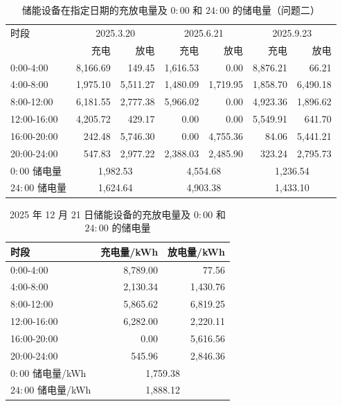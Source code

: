 \begin{table}[htbp]
  \centering
  \caption{储能设备在指定日期的充放电量及 $0{:}00$ 和 $24{:}00$ 的储电量（问题二）}
  \label{tab:p2-storage}
  \footnotesize
  \begin{tabular}{lrrrrrr}
    \toprule
    时段 & \multicolumn{2}{c}{2025.3.20} & \multicolumn{2}{c}{2025.6.21} & \multicolumn{2}{c}{2025.9.23} \\
     & 充电 & 放电 & 充电 & 放电 & 充电 & 放电 \\
    \midrule
    0{:}00-4{:}00 & 8,166.69 & 149.45 & 1,616.53 & 0.00 & 8,876.21 & 66.21 \\
    4{:}00-8{:}00 & 1,975.10 & 5,511.27 & 1,480.09 & 1,719.95 & 1,858.70 & 6,490.18 \\
    8{:}00-12{:}00 & 6,181.55 & 2,777.38 & 5,966.02 & 0.00 & 4,923.36 & 1,896.62 \\
    12{:}00-16{:}00 & 4,205.72 & 429.17 & 0.00 & 0.00 & 5,549.91 & 641.70 \\
    16{:}00-20{:}00 & 242.48 & 5,746.30 & 0.00 & 4,755.36 & 84.06 & 5,441.21 \\
    20{:}00-24{:}00 & 547.83 & 2,977.22 & 2,388.03 & 2,485.90 & 323.24 & 2,795.73 \\
    \midrule
    $0{:}00$ 储电量 & \multicolumn{2}{c}{1,982.53} & \multicolumn{2}{c}{4,554.68} & \multicolumn{2}{c}{1,236.54} \\
    $24{:}00$ 储电量 & \multicolumn{2}{c}{1,624.64} & \multicolumn{2}{c}{4,903.38} & \multicolumn{2}{c}{1,433.10} \\
  \end{tabular}
\end{table}

\begin{table}[htbp]
  \centering
  \caption{2025 年 12 月 21 日储能设备的充放电量及 $0{:}00$ 和 $24{:}00$ 的储电量}
  \label{tab:p2-storage-dec}
  \footnotesize
  \begin{tabular}{lrr}
    \toprule
    时段 & 充电量/kWh & 放电量/kWh \\
    \midrule
    0{:}00-4{:}00 & 8,789.00 & 77.56 \\
    4{:}00-8{:}00 & 2,130.34 & 1,430.76 \\
    8{:}00-12{:}00 & 5,865.62 & 6,819.25 \\
    12{:}00-16{:}00 & 6,282.00 & 2,220.11 \\
    16{:}00-20{:}00 & 0.00 & 5,616.56 \\
    20{:}00-24{:}00 & 545.96 & 2,846.36 \\
    \midrule
    $0{:}00$ 储电量/kWh & \multicolumn{2}{c}{1,759.38} \\
    $24{:}00$ 储电量/kWh & \multicolumn{2}{c}{1,888.12} \\
    \bottomrule
  \end{tabular}
\end{table}

